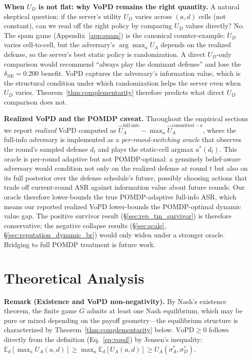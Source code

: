 \documentclass{article}
\newcommand{\UA}{U_A}
\begin{document}
\textbf{When $U_D$ is not flat: why VoPD remains the right quantity.} A natural skeptical question: if the server's utility $U_D$ varies across $(a, d)$ cells (not constant), can we read off the right policy by comparing $U_D$ values directly? No. The spam game (Appendix~\ref{app:spam}) is the canonical counter-example: $U_D$ varies cell-to-cell, but the adversary's $\arg\max_a U_A$ depends on the realized defense, so the server's best static policy is randomization. A direct $U_D$-only comparison would recommend ``always play the dominant defense'' and lose the $\delta_{\mathrm{NE}} = 0.200$ benefit. VoPD captures the adversary's information value, which is the structural condition under which randomization helps the server even when $U_D$ varies. Theorem~\ref{thm:complementarity} therefore predicts what direct $U_D$ comparison does not.

\textbf{Realized VoPD and the POMDP caveat.} Throughout the empirical sections we report \emph{realized} VoPD computed as $\hat U_A^{\text{full-info}} - \max_a \hat U_A^{\text{committed}-a}$, where the full-info adversary is implemented as a \emph{per-round-switching oracle} that observes the round's sampled defense $d_t$ and plays the static-cell argmax $a^*(d_t)$. This oracle is per-round adaptive but not POMDP-optimal: a genuinely belief-aware adversary would condition not only on the realized defense at round $t$ but also on its full posterior over the defense schedule's future, possibly choosing actions that trade off current-round ASR against information value about future rounds. Our oracle therefore lower-bounds the true POMDP-adaptive full-info ASR, which means our reported realized VoPD lower-bounds the POMDP-optimal dynamic value gap. The positive survivor result (§\ref{sec:rep_tm_survivor}) is therefore conservative; the negative collapse results (§\ref{sec:scale}, §\ref{sec:reputation_dynamic_br}) would only widen under a stronger oracle. Bridging to full POMDP treatment is future work.

\section{Theoretical Analysis}
\label{sec:theory}

\textbf{Remark (Existence and VoPD non-negativity).} By Nash's existence theorem, the finite game $G$ admits at least one Nash equilibrium, which may be pure or mixed depending on the payoff geometry---the equilibrium structure is characterized by Theorem~\ref{thm:complementarity} below. $\text{VoPD} \geq 0$ follows directly from the definition (Eq.~\ref{eq:vopd}) by Jensen's inequality: $\mathbb{E}_d[\max_a \UA(a,d)] \geq \max_a \mathbb{E}_d[\UA(a,d)] \geq \UA(\sigma_A^*, \sigma_D^*)$.
\end{document}
